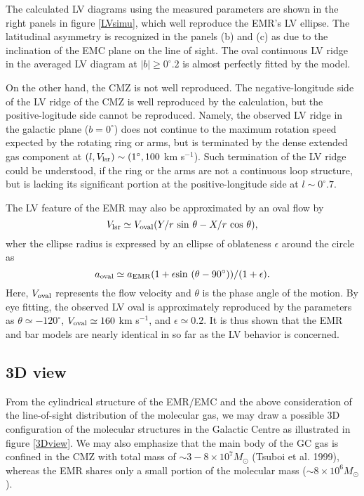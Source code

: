 \documentclass[useAMS,usenatbib]{mn2e}
\def\kms{km s$^{-1}$}
\def\vlsr{V_{\rm lsr}}
\def\voval{V_{\rm oval}}
\def\Msun{M_\odot}
\def\deg{^\circ}\def\Deg{^\circ}
\begin{document}
The calculated LV diagrams using the measured parameters are shown in the right panels in figure \ref{LVsimu}, which well reproduce the EMR's LV ellipse. The latitudinal asymmetry is recognized in the panels (b) and (c) as due to the inclination of the EMC plane on the line of sight. The oval  continuous LV ridge in the averaged LV diagram at $|b|\ge 0\deg.2$ is almost perfectly fitted by the model.

On the other hand, the CMZ is not well reproduced. The negative-longitude side of the LV ridge of the CMZ is well reproduced by the calculation, but the positive-logitude side cannot be reproduced. Namely, the observed LV ridge in the galactic plane ($b=0\deg$) does not continue to the maximum rotation speed expected by the rotating ring or arms, but is terminated by the dense extended gas component at $(l,\vlsr)\sim (1\deg, 100$ \kms). Such termination of the LV ridge could be understood, if the ring or the arms are not a continuous loop structure, but is lacking its significant portion at the positive-longitude side at $l\sim 0\deg.7$.  
  
The LV feature of the EMR may also be approximated by an oval flow by 
\begin{equation}
\vlsr \simeq \voval (Y/r \ {\rm sin} \ \theta -X/r \ {\rm cos} \ \theta),
\label{vplg}
\end{equation}
wher the ellipse radius is expressed by an ellipse of oblateness $\epsilon$ around the circle as
\begin{equation}
a_{\rm oval} \simeq a_{\rm EMR} (1+\epsilon {\rm sin} \ (\theta-90\deg))/(1+\epsilon).
\label{vplg}
\end{equation}
Here, $\voval$ represents the flow velocity and $\theta$ is the phase angle of the motion. By eye fitting, the observed LV oval is approximately reproduced by the parameters as $\theta \simeq -120\deg$, $\voval \simeq 160$ \kms, and $\epsilon \simeq 0.2$. It is thus shown that the EMR and bar models are nearly identical in so far as the LV behavior is concerned. 

\subsection{3D view}

From the cylindrical structure of the EMR/EMC and the above consideration of the line-of-sight distribution of the molecular gas, we may draw a possible 3D configuration of the molecular structures in the Galactic Centre as illustrated in figure \ref{3Dview}. We may also emphasize that the main body of the GC gas is confined in the CMZ with total mass of $\sim 3-8 \times 10^7 \Msun$ (Tsuboi et al. 1999), whereas the EMR shares only a small portion of the molecular mass ($\sim 8\times 10^6 \Msun$).
\end{document}
